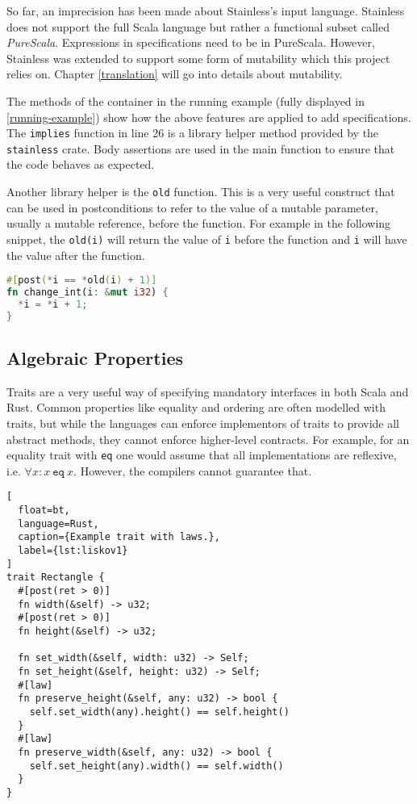 So far, an imprecision has been made about Stainless's input language. Stainless
does not support the full Scala language but rather a functional subset called
\emph{PureScala}. Expressions in specifications need to be in PureScala.
However, Stainless was extended to support some form of mutability \cite{regb}
which this project relies on. Chapter \ref{translation} will go into details
about mutability.

The methods of the container in the running example (fully displayed in
\autoref{running-example}) show how the above features are applied to add
specifications. The \lstinline!implies! function in line 26 is a library helper
method provided by the \lstinline!stainless! crate. Body assertions are used in
the main function to ensure that the code behaves as expected.

Another library helper is the \lstinline!old! function. This is a very useful
construct that can be used in postconditions to refer to the value of a mutable
parameter, usually a mutable reference, before the function. For example in the
following snippet, the \lstinline!old(i)! will return the value of \lstinline!i!
before the function and  \lstinline!i! will have the value after the function.

\begin{lstlisting}[language=Rust]
#[post(*i == *old(i) + 1)]
fn change_int(i: &mut i32) {
  *i = *i + 1;
}
\end{lstlisting}

\subsection{Algebraic Properties}
\label{laws-intro}

Traits are a very useful way of specifying mandatory interfaces in both Scala
and Rust. Common properties like equality and ordering are often modelled with
traits, but while the languages can enforce implementors of traits to provide
all abstract methods, they cannot enforce higher-level contracts. For example,
for an equality trait with \texttt{eq} one would assume that all implementations
are reflexive, i.e. $\forall x: x~\mathtt{eq}~x$. However, the compilers cannot
guarantee that.

\begin{lstlisting}[
  float=bt,
  language=Rust,
  caption={Example trait with laws.},
  label={lst:liskov1}
]
trait Rectangle {
  #[post(ret > 0)]
  fn width(&self) -> u32;
  #[post(ret > 0)]
  fn height(&self) -> u32;

  fn set_width(&self, width: u32) -> Self;
  fn set_height(&self, height: u32) -> Self;
  #[law]
  fn preserve_height(&self, any: u32) -> bool {
    self.set_width(any).height() == self.height()
  }
  #[law]
  fn preserve_width(&self, any: u32) -> bool {
    self.set_height(any).width() == self.width()
  }
}
\end{lstlisting}



